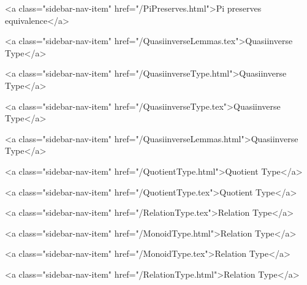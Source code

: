           <a class="sidebar-nav-item" href="/PiPreserves.html">Pi preserves equivalence</a>
        
      
    
      
        
          <a class="sidebar-nav-item" href="/QuasiinverseLemmas.tex">Quasiinverse Type</a>
        
      
    
      
        
          <a class="sidebar-nav-item" href="/QuasiinverseType.html">Quasiinverse Type</a>
        
      
    
      
        
          <a class="sidebar-nav-item" href="/QuasiinverseType.tex">Quasiinverse Type</a>
        
      
    
      
        
          <a class="sidebar-nav-item" href="/QuasiinverseLemmas.html">Quasiinverse Type</a>
        
      
    
      
        
          <a class="sidebar-nav-item" href="/QuotientType.html">Quotient Type</a>
        
      
    
      
        
          <a class="sidebar-nav-item" href="/QuotientType.tex">Quotient Type</a>
        
      
    
      
        
          <a class="sidebar-nav-item" href="/RelationType.tex">Relation Type</a>
        
      
    
      
        
          <a class="sidebar-nav-item" href="/MonoidType.html">Relation Type</a>
        
      
    
      
        
          <a class="sidebar-nav-item" href="/MonoidType.tex">Relation Type</a>
        
      
    
      
        
          <a class="sidebar-nav-item" href="/RelationType.html">Relation Type</a>
        
      
    
